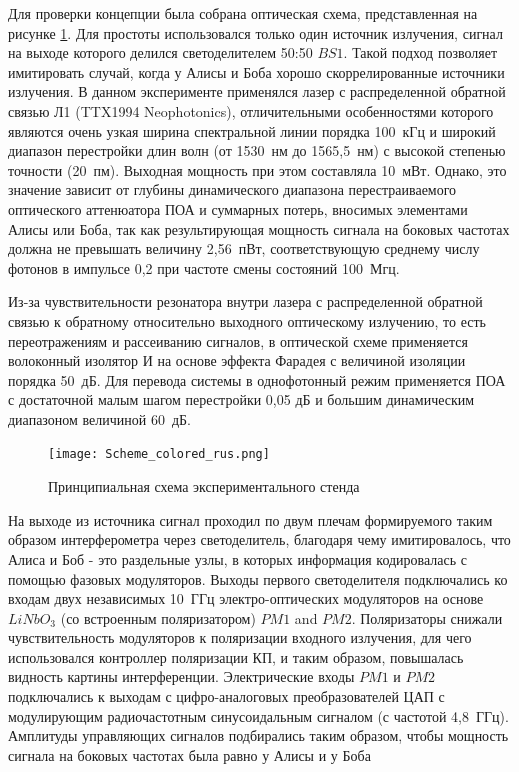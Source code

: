   Для проверки концепции была собрана оптическая схема, представленная на рисунке \ref{fig:RF_sin}. Для простоты использовался только один источник излучения, сигнал на выходе которого делился светоделителем 50:50 $BS1$. Такой подход позволяет имитировать случай, когда у Алисы и Боба хорошо скоррелированные источники излучения. В данном эксперименте применялся лазер с распределенной обратной связью Л1 (TTX1994 Neophotonics), отличительными особенностями которого являются очень узкая ширина спектральной линии порядка 100~кГц и широкий диапазон перестройки длин волн (от 1530~нм до 1565,5~нм) с высокой степенью точности (20~пм). Выходная мощность при этом составляла 10~мВт. Однако, это значение зависит от глубины динамического диапазона перестраиваемого оптического аттенюатора ПОА и суммарных потерь, вносимых элементами Алисы или Боба, так как результирующая мощность сигнала на боковых частотах должна не превышать величину 2,56~пВт, соответствующую среднему числу фотонов в импульсе 0,2 при частоте смены состояний 100~Мгц.   

Из-за чувствительности резонатора внутри лазера с распределенной обратной связью к обратному относительно выходного оптическому излучению, то есть переотражениям и рассеиванию сигналов, в оптической схеме применяется волоконный изолятор И на основе эффекта Фарадея с величиной изоляции порядка 50~дБ. Для перевода системы в однофотонный режим применяется ПОА с достаточной малым шагом перестройки 0,05 дБ и большим динамическим диапазоном величиной 60~дБ.  

  

  \begin{figure}[ht]
  \centering
  \texttt{[image: Scheme\_colored\_rus.png]}
  \caption{Принципиальная схема экспериментального стенда}
  \label{fig:RF_sin}
\end{figure}

  
 
  
На выходе из источника сигнал проходил по двум плечам формируемого таким образом интерферометра через светоделитель, благодаря чему имитировалось, что Алиса и Боб - это раздельные узлы, в которых информация кодировалась с помощью фазовых модуляторов. Выходы первого светоделителя подключались ко входам двух независимых 10~ГГц электро-оптических модуляторов на основе $LiNbO_3$ (со встроенным поляризатором) $PM1$ and $PM2$. Поляризаторы снижали чувствительность модуляторов к поляризации входного излучения, для чего использовался контроллер поляризации КП, и таким образом, повышалась видность картины интерференции. Электрические входы $PM1$ и $PM2$ подключались к выходам с цифро-аналоговых преобразователей ЦАП с модулирующим радиочастотным синусоидальным сигналом (с частотой 4,8~ГГц). Амплитуды управляющих сигналов подбирались таким образом, чтобы мощность сигнала на боковых частотах была равно у Алисы и у Боба

